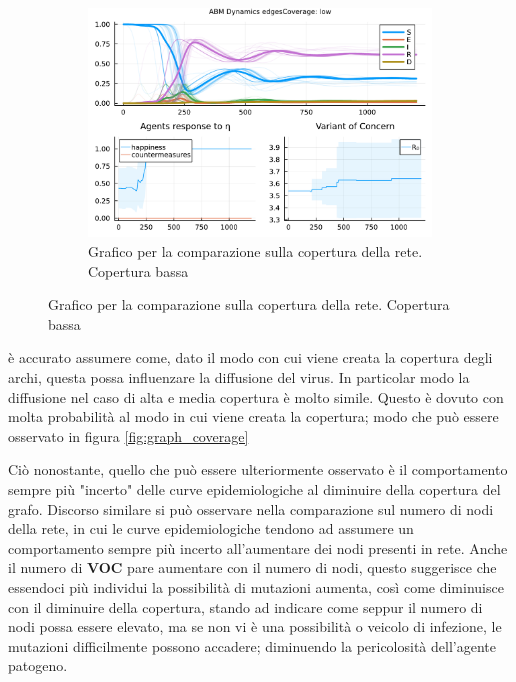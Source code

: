 \begin{figure}[!hb]
\begin{subfigure}[b]{0.3\textwidth}
		\includegraphics[width=\textwidth]{img/SocialNetworkABM_3_EC.pdf}
		\caption{Grafico per la comparazione sulla copertura della rete. Copertura bassa}
		\label{fig:comparison_lowCoverage}
	\end{subfigure}
\end{figure}

è accurato assumere come, dato il modo con cui viene creata la copertura degli archi, questa 
possa influenzare la diffusione del virus. In particolar modo la diffusione nel caso di alta e media copertura 
è molto simile. Questo è dovuto con molta probabilità al modo in cui viene creata la copertura; modo che 
può essere osservato in figura \ref{fig:graph_coverage}

Ciò nonostante, quello che può essere ulteriormente osservato è il comportamento sempre più "incerto" delle curve 
epidemiologiche al diminuire della copertura del grafo. Discorso similare si può osservare nella comparazione sul numero 
di nodi della rete, in cui le curve epidemiologiche tendono ad assumere un comportamento sempre più incerto all'aumentare dei 
nodi presenti in rete. Anche il numero di \textbf{VOC} pare aumentare con il numero di nodi, questo suggerisce che essendoci 
più individui la possibilità di mutazioni aumenta, così come diminuisce con il diminuire della copertura, stando ad indicare 
come seppur il numero di nodi possa essere elevato, ma se non vi è una possibilità o veicolo di infezione, le mutazioni difficilmente
possono accadere; diminuendo la pericolosità dell'agente patogeno.

